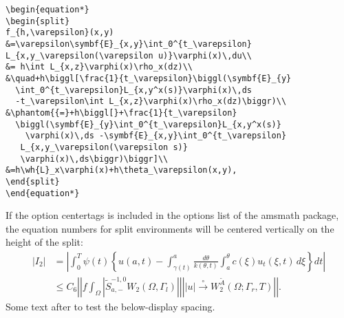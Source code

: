 \documentclass{article}
\newcommand{\ntt}{\normalfont\ttfamily}
\newcommand{\pkg}[1]{{\protect\ntt#1}}
\newcommand{\env}[1]{{\protect\ntt#1}}
\theoremstyle{definition}
\theoremstyle{remark}
\newcommand{\wt}{\widetilde}
\newcommand{\wh}{\widehat}
\newcommand{\envert}[1]{\left\lvert#1\right\rvert}
\let\abs=\envert
\begin{document}
\begin{verbatim}
\begin{equation*}
\begin{split}
f_{h,\varepsilon}(x,y)
&=\varepsilon\symbf{E}_{x,y}\int_0^{t_\varepsilon}
L_{x,y_\varepsilon(\varepsilon u)}\varphi(x)\,du\\
&= h\int L_{x,z}\varphi(x)\rho_x(dz)\\
&\quad+h\biggl[\frac{1}{t_\varepsilon}\biggl(\symbf{E}_{y}
  \int_0^{t_\varepsilon}L_{x,y^x(s)}\varphi(x)\,ds
  -t_\varepsilon\int L_{x,z}\varphi(x)\rho_x(dz)\biggr)\\
&\phantom{{=}+h\biggl[}+\frac{1}{t_\varepsilon}
  \biggl(\symbf{E}_{y}\int_0^{t_\varepsilon}L_{x,y^x(s)}
    \varphi(x)\,ds -\symbf{E}_{x,y}\int_0^{t_\varepsilon}
   L_{x,y_\varepsilon(\varepsilon s)}
   \varphi(x)\,ds\biggr)\biggr]\\
&=h\wh{L}_x\varphi(x)+h\theta_\varepsilon(x,y),
\end{split}
\end{equation*}
\end{verbatim}

\newpage
If the option \env{centertags} is included in the options
list of the \pkg{amsmath} package,
the equation numbers for \env{split} environments will be
centered vertically on the height
of  the \env{split}:
{\makeatletter\ctagsplit@true
\begin{equation}
\begin{split}
 \abs{I_2}&=\left\lvert \int_{0}^T \psi(t)\left\{u(a,t)-\int_{\gamma(t)}^a
  \frac{d\theta}{k(\theta,t)}
  \int_{a}^\theta c(\xi)u_t(\xi,t)\,d\xi\right\}dt\right\rvert\\
&\le C_6\left\lvert \left\lvert f\int_\Omega\left\lvert \wt{S}^{-1,0}_{a,-}
  W_2(\Omega,\Gamma_l)\right\rvert\right\rvert
  \left\lvert \abs{u}\overset{\circ}\to W_2^{\wt{A}}
  (\Omega;\Gamma_r,T)\right\rvert\right\rvert.
\end{split}
\end{equation}}%
Some text after to test the below-display spacing.

\end{document}
